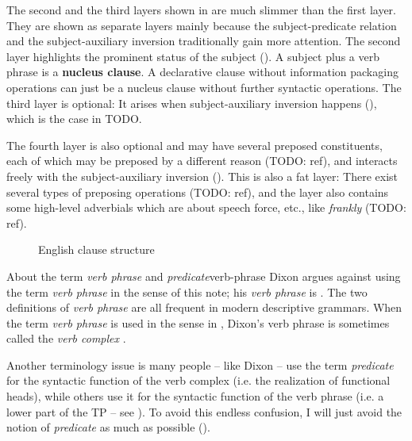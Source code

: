 \documentclass[UTF8, a4paper, oneside, scheme=plain]{ctexrep}
\newcommand*{\concept}[1]{\textbf{#1}}
\newcommand*{\term}[1]{\emph{#1}}
\newcommand{\corpus}[1]{\emph{#1}}
\begin{document}
The second and the third layers shown in 
are much slimmer than the first layer.
They are shown as separate layers mainly because 
the subject-predicate relation 
and the subject-auxiliary inversion 
traditionally gain more attention.
The second layer highlights the prominent status of the subject ().
A subject plus a verb phrase is a \concept{nucleus clause}.
A declarative clause without information packaging operations
can just be a nucleus clause without further syntactic operations.
The third layer is optional:
It arises when subject-auxiliary inversion happens (),
which is the case in TODO.

The fourth layer is also optional and may have several preposed constituents,
each of which may be preposed by a different reason (TODO: ref),
and interacts freely with the subject-auxiliary inversion ().
This is also a fat layer:
There exist several types of preposing operations (TODO: ref),
and the layer also contains some high-level adverbials
which are about speech force, etc.,
like \corpus{frankly} (TODO: ref).

\begin{figure}[H]
    \centering
    
    \caption{English clause structure}
    \label{fig:clause-template}
\end{figure}

\begin{infobox}{About the term \term{verb phrase} and \term{predicate}}{verb-phrase}
    Dixon argues against using the term \term{verb phrase} in the sense of this note;
    his \term{verb phrase} is .
    The two definitions of \term{verb phrase} are all frequent in modern descriptive grammars.
    When the term \term{verb phrase} is used in the sense in ,
    Dixon's verb phrase is sometimes called the \term{verb complex} \citep{Friesen2017}.

    Another terminology issue is many people -- like Dixon -- use the term \term{predicate}
    for the syntactic function of the verb complex
    (i.e. the realization of functional heads),
    while others use it for the syntactic function of the verb phrase 
    (i.e. a lower part of the TP -- see ).
    To avoid this endless confusion, 
    I will just avoid the notion of \term{predicate} as much as possible ().
\end{infobox}
\end{document}
